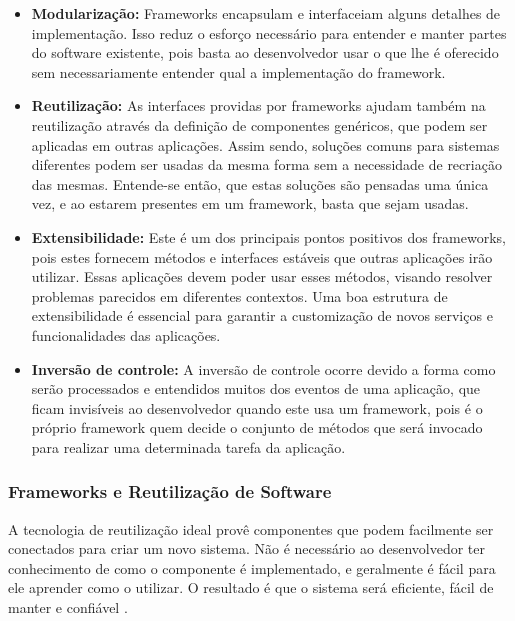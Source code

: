 \begin{itemize}
	\item \textbf{Modularização:} Frameworks encapsulam e interfaceiam alguns detalhes de implementação. Isso reduz o esforço necessário para entender e manter partes do software existente, pois basta ao desenvolvedor usar o que lhe é oferecido sem necessariamente entender qual a implementação do framework.

	\item \textbf{Reutilização:} As interfaces providas por frameworks ajudam também na reutilização através da definição de componentes genéricos, que podem ser aplicadas em outras aplicações. Assim sendo, soluções comuns para sistemas diferentes podem ser usadas da mesma forma sem a necessidade de recriação das mesmas. Entende-se então, que estas soluções são pensadas uma única vez, e ao estarem presentes em um framework, basta que sejam usadas.

	\item \textbf{Extensibilidade:} Este é um dos principais pontos positivos dos frameworks, pois estes fornecem métodos e interfaces estáveis que outras aplicações irão utilizar. Essas aplicações devem poder usar esses métodos, visando resolver problemas parecidos em diferentes contextos. Uma boa estrutura de extensibilidade é essencial para garantir a customização de novos serviços e funcionalidades das aplicações.

	\item \textbf{Inversão de controle:} A inversão de controle ocorre devido a forma como serão processados e entendidos muitos dos eventos de uma aplicação, que ficam invisíveis ao desenvolvedor quando este usa um framework, pois é o próprio framework quem decide o conjunto de métodos que será invocado para realizar uma determinada tarefa da aplicação.
\end{itemize}

\subsubsection{Frameworks e Reutilização de Software}

A tecnologia de reutilização ideal provê componentes que podem facilmente ser conectados para criar um novo sistema. Não é necessário ao desenvolvedor ter conhecimento de como o componente é implementado, e geralmente é fácil para ele aprender como o utilizar. O resultado é que o sistema será eficiente, fácil de manter e confiável \cite{Johnson:1997}.

